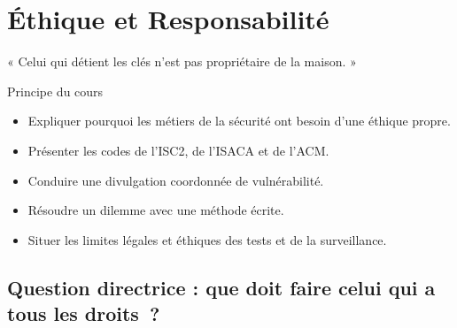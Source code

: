 
\chapter{Éthique et Responsabilité}
\label{chap:ethique}

\epigraph{%
    « Celui qui détient les clés n'est pas propriétaire de la maison. »%
}{Principe du cours}


\begin{boxobjectifs}
\begin{itemize}
    \item Expliquer pourquoi les métiers de la sécurité ont besoin d'une
          éthique propre.
    \item Présenter les codes de l'ISC2, de l'ISACA et de l'ACM.
    \item Conduire une divulgation coordonnée de vulnérabilité.
    \item Résoudre un dilemme avec une méthode écrite.
    \item Situer les limites légales et éthiques des tests et de la
          surveillance.
\end{itemize}
\end{boxobjectifs}

\bigskip

\section*{Question directrice : que doit faire celui qui a tous les droits~?}

